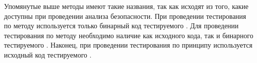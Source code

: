 %
Упомянутые выше методы имеют такие названия, так как исходят из того, какие  доступны при проведении анализа безопасности. 
%
При проведении тестирования  по методу  используется только бинарный код тестируемого . 
%
Для проведении тестирования  по методу  необходимо наличие как исходного кода, так и бинарного тестируемого . 
%
Наконец, при проведении тестирования  по принципу  используется исходный код тестируемого .
